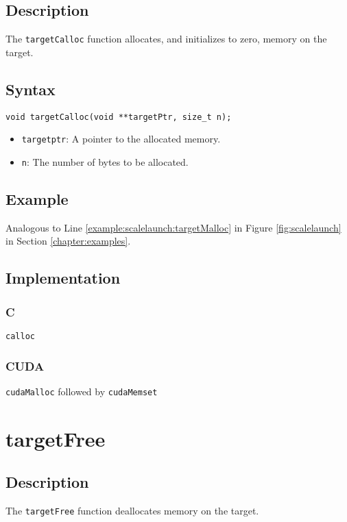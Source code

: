 \subsection{Description}

The \verb+targetCalloc+ function allocates, and initializes to zero, memory on the target.

\subsection{Syntax}
\begin{verbatim}
void targetCalloc(void **targetPtr, size_t n);
\end{verbatim}

\begin{itemize}
\item \verb+targetptr+: A pointer to the allocated memory.
\item \verb+n+: The number of bytes to be allocated.
\end{itemize}


\subsection{Example}
Analogous to Line \ref{example:scalelaunch:targetMalloc} in Figure \ref{fig:scalelaunch} in Section \ref{chapter:examples}.

\subsection{Implementation}
\subsubsection{C}
\verb+calloc+
\subsubsection{CUDA}
\verb+cudaMalloc+ followed by \verb+cudaMemset+

\newpage
\section{targetFree}

\subsection{Description}

The \verb+targetFree+ function deallocates memory on the target.

